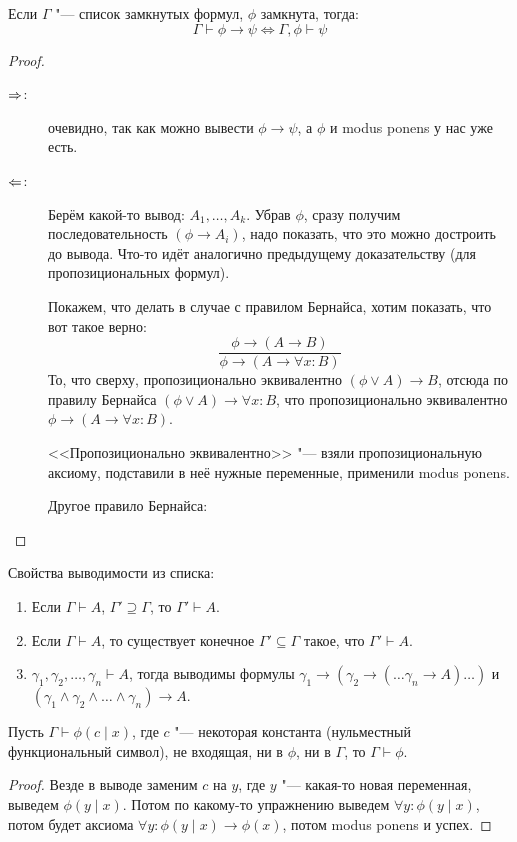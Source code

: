 \begin{lemma}[о дедукции]
	Если $\Gamma$ "--- список замкнутых формул, $\phi$ замкнута, тогда:
	\[ \Gamma \vdash \phi \to \psi \iff \Gamma, \phi \vdash \psi \]
\end{lemma}
\begin{proof}
	\begin{description}
	\item[$\Rightarrow$:]
		очевидно, так как можно вывести $\phi \to \psi$, а $\phi$ и modus ponens у нас уже  есть.
	\item[$\Leftarrow$:]
		Берём какой-то вывод: $A_1, \dots, A_k$.
		Убрав $\phi$, сразу получим последовательность $(\phi \to A_i)$, надо показать, что
		это можно достроить до вывода.
		Что-то идёт аналогично предыдущему доказательству (для пропозициональных формул).
		
		Покажем, что делать в случае с правилом Бернайса, хотим показать, что вот такое верно:
		\[ \frac{\phi \to (A \to B)}{\phi \to (A \to \forall x \colon B)} \]
		То, что сверху, пропозиционально эквивалентно $(\phi \lor A) \to B$, отсюда
		по правилу Бернайса $(\phi \lor A) \to \forall x \colon B$,
		что пропозиционально эквивалентно $\phi \to (A \to \forall x \colon B)$.
		\begin{Rem}
			<<Пропозиционально эквивалентно>> "--- взяли пропозициональную аксиому,
			подставили в неё нужные переменные, применили modus ponens.
		\end{Rem}

		Другое правило Бернайса: \TODO
	\end{description}
\end{proof}

Свойства выводимости из списка:
\begin{enumerate}
	\item Если $\Gamma \vdash A$, $\Gamma' \supseteq \Gamma$, то $\Gamma' \vdash A$.
	\item Если $\Gamma \vdash A$, то существует конечное $\Gamma' \subseteq \Gamma$ такое, что $\Gamma' \vdash A$.
	\item $\gamma_1, \gamma_2, \dots, \gamma_n \vdash A$, тогда выводимы формулы
		$\gamma_1 \to (\gamma_2 \to (\dots \gamma_n \to A)\dots)$
		и
		$(\gamma_1 \land \gamma_2 \land \dots \land \gamma_n) \to A$.
\end{enumerate}

\begin{lemma}
	Пусть $\Gamma \vdash \phi(c \mid x)$, где $c$ "--- некоторая константа (нульместный функциональный символ), не входящая, ни в $\phi$, ни в $\Gamma$,
	то $\Gamma \vdash \phi$.
\end{lemma}
\begin{proof}
	Везде в выводе заменим $c$ на $y$, где $y$ "--- какая-то новая переменная,
	выведем $\phi(y \mid x)$.
	Потом по какому-то упражнению выведем $\forall y \colon \phi(y \mid x)$,
	потом будет аксиома $\forall y \colon \phi(y \mid x) \to \phi(x)$, потом modus ponens и успех.
\end{proof}

